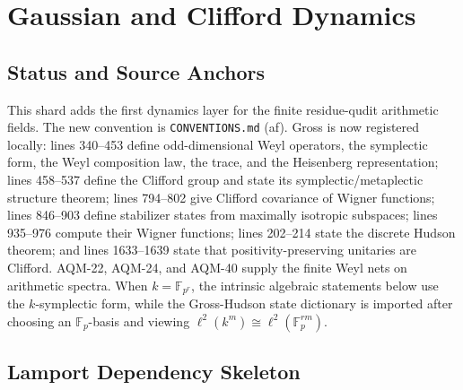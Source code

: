 
\section{Gaussian and Clifford Dynamics}
\label{sec:gaussian-clifford-dynamics}

\subsection{Status and Source Anchors}

This shard adds the first dynamics layer for the finite residue-qudit
arithmetic fields.  The new convention is \texttt{CONVENTIONS.md} (af).  Gross
 is now
registered locally: lines 340--453 define odd-dimensional Weyl operators, the
symplectic form, the Weyl composition law, the trace, and the Heisenberg
representation; lines 458--537 define the Clifford group and state its
symplectic/metaplectic structure theorem; lines 794--802 give Clifford
covariance of Wigner functions; lines 846--903 define stabilizer states from
maximally isotropic subspaces; lines 935--976 compute their Wigner functions;
lines 202--214 state the discrete Hudson theorem; and lines 1633--1639 state
that positivity-preserving unitaries are Clifford.  AQM-22, AQM-24, and
AQM-40 supply the finite Weyl nets on arithmetic spectra.
When \(k=\mathbb F_{p^r}\), the intrinsic algebraic statements below use the
\(k\)-symplectic form, while the Gross-Hudson state dictionary is imported
after choosing an \(\mathbb F_p\)-basis and viewing
\(\ell^2(k^m)\cong\ell^2(\mathbb F_p^{rm})\).

\subsection{Lamport Dependency Skeleton}

